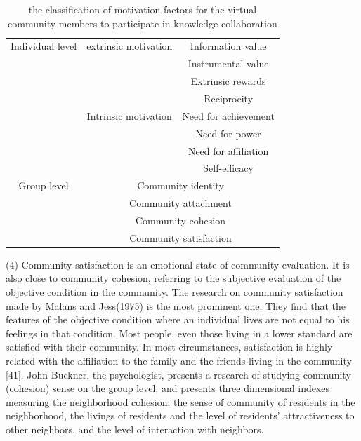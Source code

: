 \documentclass{elsarticle}
\begin{document}
\begin{table}[htpb]
  \centering
   \caption{the classification of motivation factors for the virtual
    community members to participate in knowledge collaboration}
\begin{tabular}{ccc}
    \toprule
    \multicolumn{ 1}{c|}{Individual level} & \multicolumn{ 1}{|c|}{extrinsic motivation} & Information value \\
    \multicolumn{ 1}{c|}{} & \multicolumn{ 1}{|c|}{} & Instrumental value \\
    \multicolumn{ 1}{c|}{} & \multicolumn{ 1}{|c|}{} & Extrinsic rewards \\
    \multicolumn{ 1}{c|}{} & \multicolumn{ 1}{|c|}{} & Reciprocity \\\cline{2-3}
    \multicolumn{ 1}{c|}{} & \multicolumn{ 1}{|c|}{Intrinsic motivation} & Need for achievement \\
    \multicolumn{ 1}{c|}{} & \multicolumn{ 1}{|c|}{} & Need for power \\
    \multicolumn{ 1}{c|}{} & \multicolumn{ 1}{|c|}{} & Need for affiliation \\
    \multicolumn{ 1}{c|}{} & \multicolumn{ 1}{|c|}{} & Self-efficacy \\\hline
    \multicolumn{ 1}{c|}{Group level} & \multicolumn{ 2}{|c}{Community identity} \\
    \multicolumn{ 1}{c|}{} & \multicolumn{ 2}{|c}{Community attachment} \\
    \multicolumn{ 1}{c|}{} & \multicolumn{ 2}{|c}{Community cohesion} \\
    \multicolumn{ 1}{c|}{} & \multicolumn{ 2}{|c}{Community satisfaction} \\
    \bottomrule
    \end{tabular}
\end{table}
(4) Community satisfaction is an emotional state of community
evaluation. It is also close to community cohesion, referring to the
subjective evaluation of the objective condition in the community. The
research on community satisfaction made by Malans and Jess(1975) is
the most prominent one. They find that the features of the objective
condition where an individual lives are not equal to his feelings in
that condition. Most people, even those living in a lower standard are
satisfied with their community. In most circumstances, satisfaction is
highly related with the affiliation to the family and the friends
living in the community [41]. John Buckner, the psychologist, presents
a research of studying community (cohesion) sense on the group level,
and presents three dimensional indexes measuring the neighborhood
cohesion: the sense of community of residents in the neighborhood, the
livings of residents and the level of residents’ attractiveness to
other neighbors, and the level of interaction with neighbors. 
\end{document}
